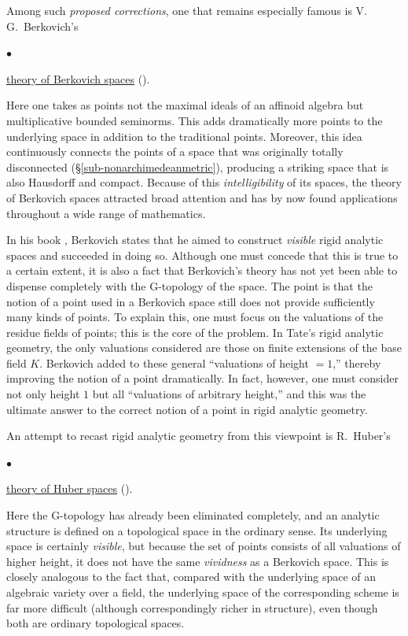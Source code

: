 \documentclass[a4paper,12pt, dvipdfmx]{jsbook}
\renewenvironment{itemize}%
{%
   \begin{list}{\parbox{1zw}{$\bullet$}}%
   {%
      \setlength{\topsep}{.5zh}
      \setlength{\itemindent}{0zw}
      \setlength{\leftmargin}{3zw}%
      \setlength{\rightmargin}{0zw}%
      \setlength{\labelsep}{.5zw}%
      \setlength{\labelwidth}{3zw}%
      \setlength{\itemsep}{0.2em}%
      \setlength{\parsep}{0em}%
      \setlength{\listparindent}{0zw}%
   }
}{%
   \end{list}%
}
\theoremstyle{plain}
\theoremstyle{definition}
\begin{document}
Among such {\it proposed corrections}, one that remains especially famous is V. G.\ Berkovich's
\begin{itemize}
\item \underline{theory of Berkovich spaces} (\cite{Berk1}\cite{Berk2}).
\end{itemize}
Here one takes as points not the maximal ideals of an affinoid algebra but multiplicative bounded seminorms.
This adds dramatically more points to the underlying space in addition to the traditional points.
Moreover, this idea continuously connects the points of a space that was originally totally disconnected (\S\ref{sub-nonarchimedeanmetric}), producing a striking space that is also Hausdorff and compact.
Because of this {\it intelligibility} of its spaces, the theory of Berkovich spaces attracted broad attention and has by now found applications throughout a wide range of mathematics.

In his book \cite{Berk1}, Berkovich states that he aimed to construct {\it visible} rigid analytic spaces and succeeded in doing so.
Although one must concede that this is true to a certain extent, it is also a fact that Berkovich's theory has not yet been able to dispense completely with the G-topology of the space.
The point is that the notion of a point used in a Berkovich space still does not provide sufficiently many kinds of points.
To explain this, one must focus on the valuations of the residue fields of points; this is the core of the problem.
In Tate's rigid analytic geometry, the only valuations considered are those on finite extensions of the base field $K$.
Berkovich added to these general ``valuations of height $=1$,'' thereby improving the notion of a point dramatically.
In fact, however, one must consider not only height $1$ but all ``valuations of arbitrary height,'' and this was the ultimate answer to the correct notion of a point in rigid analytic geometry.

An attempt to recast rigid analytic geometry from this viewpoint is R.\ Huber's
\begin{itemize}
\item \underline{theory of Huber spaces} (\cite{Hube1}\cite{Hube2}\cite{Hube3}).
\end{itemize}
Here the G-topology has already been eliminated completely, and an analytic structure is defined on a topological space in the ordinary sense.
Its underlying space is certainly {\it visible}, but because the set of points consists of all valuations of higher height, it does not have the same {\it vividness} as a Berkovich space.
This is closely analogous to the fact that, compared with the underlying space of an algebraic variety over a field, the underlying space of the corresponding scheme is far more difficult (although correspondingly richer in structure), even though both are ordinary topological spaces.
\end{document}
